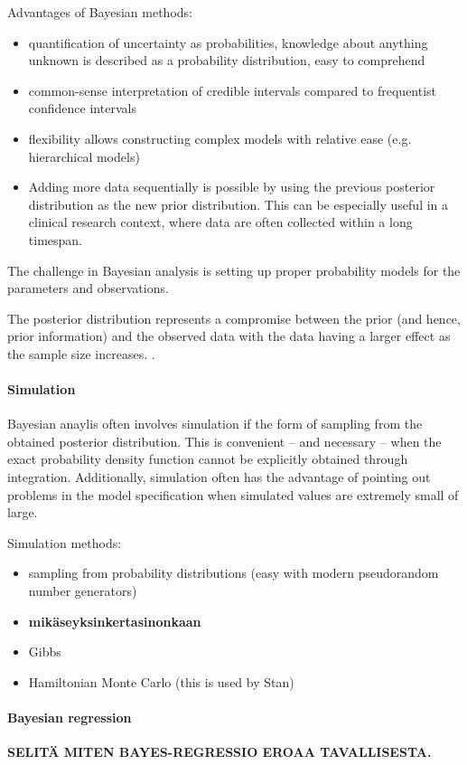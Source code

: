 Advantages of Bayesian methods:
\begin{itemize}
  \item
  quantification of uncertainty as probabilities, knowledge about anything
  unknown is described as a probability distribution, easy to comprehend
  \item
  common-sense interpretation of credible intervals compared to frequentist
  confidence intervals
  \item
  flexibility allows constructing complex models with relative ease (e.g.
  hierarchical models)
  \item
  Adding more data sequentially is possible by using the previous posterior
  distribution as the new prior distribution. This can be especially useful in
  a clinical research context, where data are often collected within a long
  timespan.
\end{itemize}
The challenge in Bayesian analysis is setting up proper probability models for
the parameters and observations. \citep{Gelman2013}

The posterior distribution represents a compromise between the prior (and
hence, prior information) and the observed data with the data having a larger
effect as the sample size increases. \citep{Gelman2013}.


\paragraph{Simulation}\label{simulation}

Bayesian anaylis often involves simulation if the form of sampling from the
obtained posterior distribution. This is convenient -- and necessary -- when
the exact probability density function cannot be explicitly obtained through
integration. Additionally, simulation often has the advantage of pointing out
problems in the model specification when simulated values are extremely small
of large.

Simulation methods:
\begin{itemize}
  \item
  sampling from probability distributions (easy with modern pseudorandom
  number generators)
  \item
  \textbf{mikäseyksinkertasinonkaan}
  \item
  Gibbs
  \item
  Hamiltonian Monte Carlo (this is used by Stan)
\end{itemize}


\paragraph{Bayesian regression}\label{bayesian-regression}

\textbf{SELITÄ MITEN BAYES-REGRESSIO EROAA TAVALLISESTA.}
